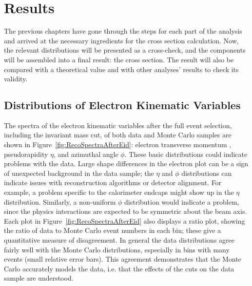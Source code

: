 \chapter{Results}
\label{res}

The previous chapters have gone through the steps 
for each part of the analysis 
and arrived at the necessary ingredients 
for the cross section calculation.  
Now, the relevant distributions will be presented 
as a cross-check, 
and the components will be assembled into a 
final result: the \Zee cross section.  
The result 
will %
also be compared with 
a theoretical value and with other 
analyses' results to check its validity.  

\section{Distributions of Electron Kinematic Variables}
\label{res:elecQuants}

The spectra of the electron kinematic variables after the full 
event selection, including the invariant mass cut, 
of both data and Monte Carlo samples 
are shown in Figure~\ref{fig:RecoSpectraAfterEid}: 
electron transverse momentum \pt, 
pseudorapidity $\eta$, and 
azimuthal angle $\phi$.  
These basic distributions could indicate problems with the data.  
Large shape differences in the electron \pT plot can 
be a sign of unexpected background in the data sample; 
the $\eta$ and $\phi$ distributions can indicate issues with 
reconstruction algorithms or detector alignment.  
For example, a problem specific to the calorimeter endcaps 
might show up in the $\eta$ distribution. 
Similarly, a non-uniform $\phi$ distribution would 
indicate a problem, since the physics interactions 
are expected to be symmetric about the beam axis.  
Each plot in Figure~\ref{fig:RecoSpectraAfterEid} also 
displays a ratio plot, showing the ratio of data to Monte Carlo 
event numbers in each bin; 
these give a quantitative measure of disagreement.  
In general the data distributions agree fairly well with the 
Monte Carlo distributions, 
especially in bins with many events (small relative error bars).  
This agreement demonstrates that 
the Monte Carlo accurately models the data, i.e. that 
the effects of the cuts on 
the data sample are understood.  


